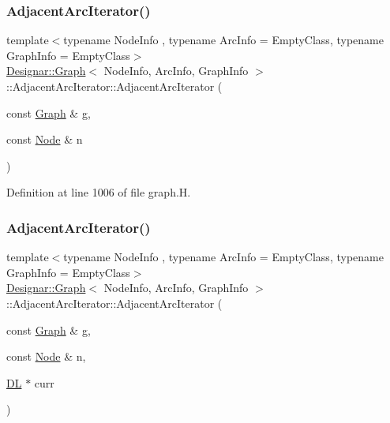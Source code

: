 \subsubsection{\texorpdfstring{Adjacent\+Arc\+Iterator()}{AdjacentArcIterator()}\hspace{0.1cm}{\footnotesize\ttfamily [2/5]}}
{\footnotesize\ttfamily template$<$typename Node\+Info , typename Arc\+Info  = Empty\+Class, typename Graph\+Info  = Empty\+Class$>$ \\
\hyperlink{class_designar_1_1_graph}{Designar\+::\+Graph}$<$ Node\+Info, Arc\+Info, Graph\+Info $>$\+::Adjacent\+Arc\+Iterator\+::\+Adjacent\+Arc\+Iterator (\begin{DoxyParamCaption}\item[{const \hyperlink{class_designar_1_1_graph}{Graph} \&}]{g,  }\item[{const \hyperlink{class_designar_1_1_graph_a5dfc7dba9d092ac489c72e40390c37d0}{Node} \&}]{n }\end{DoxyParamCaption})\hspace{0.3cm}{\ttfamily [inline]}}



Definition at line 1006 of file graph.\+H.

\mbox{\label{class_designar_1_1_graph_1_1_adjacent_arc_iterator_a97e3e5909f6e9b9b6b55cbc0fb2d5263}} 
\subsubsection{\texorpdfstring{Adjacent\+Arc\+Iterator()}{AdjacentArcIterator()}\hspace{0.1cm}{\footnotesize\ttfamily [3/5]}}
{\footnotesize\ttfamily template$<$typename Node\+Info , typename Arc\+Info  = Empty\+Class, typename Graph\+Info  = Empty\+Class$>$ \\
\hyperlink{class_designar_1_1_graph}{Designar\+::\+Graph}$<$ Node\+Info, Arc\+Info, Graph\+Info $>$\+::Adjacent\+Arc\+Iterator\+::\+Adjacent\+Arc\+Iterator (\begin{DoxyParamCaption}\item[{const \hyperlink{class_designar_1_1_graph}{Graph} \&}]{g,  }\item[{const \hyperlink{class_designar_1_1_graph_a5dfc7dba9d092ac489c72e40390c37d0}{Node} \&}]{n,  }\item[{\hyperlink{class_designar_1_1_d_l}{DL} $\ast$}]{curr }\end{DoxyParamCaption})\hspace{0.3cm}{\ttfamily [inline]}}



